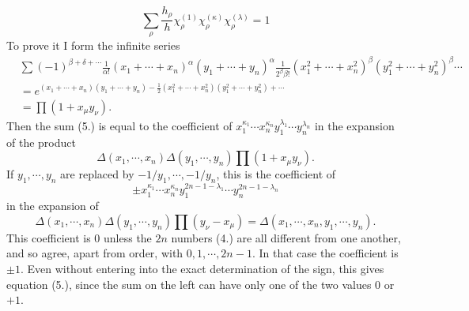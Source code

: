 \documentclass[11pt]{article}
\begin{document}
\begin{equation}\tag{5.}
 \sum_\rho\frac{h_\rho}{h}\chi_\rho^{(1)}\chi_\rho^{(\kappa)}\chi_\rho^{(\lambda)}=1
\end{equation}
To prove it I form the infinite series
\[
\begin{aligned}
 &\sum (-1)^{\beta+
\delta+
\cdots}\frac1{\alpha!}(x_1+
\cdots+x_n)^\alpha(y_1+
\cdots+y_n)^\alpha
 \frac1{2^\beta\beta!}(x_1^2+
\cdots+x_n^2)^\beta(y_1^2+
\cdots+y_n^2)^\beta\cdots\\
 &=e^{(x_1+
\cdots+x_n)(y_1+
\cdots+y_n)-\frac12(x_1^2+
\cdots+x_n^2)(y_1^2+
\cdots+y_n^2)+
\cdots}\\
 &=\prod(1+x_\mu y_\nu).
\end{aligned}
\]
Then the sum (5.) is equal to the coefficient of $x_1^{\kappa_1}\cdots x_n^{\kappa_n}y_1^{\lambda_1}\cdots y_n^{\lambda_n}$ in the expansion of the product
\[
 \Delta(x_1,
\cdots,x_n)\Delta(y_1,
\cdots,y_n)\prod(1+x_\mu y_\nu).
\]
If $y_1,\cdots,y_n$ are replaced by $-1/y_1,
\cdots,-1/y_n$, this is the coefficient of
\[
\pm x_1^{\kappa_1}\cdots x_n^{\kappa_n}
y_1^{2n-1-\lambda_1}\cdots y_n^{2n-1-\lambda_n}
\]
in the expansion of
\[
 \Delta(x_1,
\cdots,x_n)\Delta(y_1,
\cdots,y_n)\prod(y_\nu-x_\mu)=\Delta(x_1,
\cdots,x_n,y_1,
\cdots,y_n).
\]
This coefficient is $0$ unless the $2n$ numbers (4.) are all different from one another, and so agree, apart from order, with $0,1,\cdots,2n-1$. In that case the coefficient is $\pm1$. Even without entering into the exact determination of the sign, this gives equation (5.), since the sum on the left can have only one of the two values $0$ or $+1$.
\end{document}

